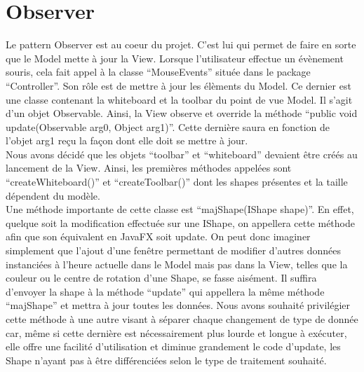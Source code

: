 \chapter{Observer}

Le pattern Observer est au coeur du projet. C'est lui qui permet de faire en sorte que le Model mette à jour
la View. Lorsque l'utilisateur effectue un évènement souris, cela fait appel à la classe ``MouseEvents'' située
dans le package ``Controller''. Son rôle est de mettre à jour les élèments du Model. Ce dernier est une classe contenant la whiteboard
et la toolbar du point de vue Model. Il s'agit d'un objet Observable. Ainsi, la View observe et override la méthode ``public void update(Observable arg0, Object arg1)''.
Cette dernière saura en fonction de l'objet arg1 reçu la façon dont elle doit se mettre à jour.
\\
Nous avons décidé que les objets ``toolbar'' et ``whiteboard'' devaient être créés au lancement de la View. Ainsi, les premières méthodes appelées sont ``createWhiteboard()'' et
``createToolbar()'' dont les shapes présentes et la taille dépendent du modèle.
\\
Une méthode importante de cette classe est ``majShape(IShape shape)''. En effet, quelque soit la modification effectuée sur une IShape, on appellera cette méthode afin que son
équivalent en JavaFX soit update. On peut donc imaginer simplement que l'ajout d'une fenêtre permettant de modifier d'autres données instanciées à l'heure actuelle dans le Model
mais pas dans la View, telles que la couleur ou le centre de rotation d'une Shape, se fasse aisément. Il suffira d'envoyer la shape à la méthode ``update'' qui appellera la même
méthode ``majShape'' et mettra à jour toutes les données. Nous avons souhaité privilégier cette méthode à une autre visant à séparer chaque changement de type de donnée car, même
si cette dernière est nécessairement plus lourde et longue à exécuter, elle offre une facilité d'utilisation et diminue grandement le code d'update, les Shape n'ayant pas à être
différenciées selon le type de traitement souhaité.
